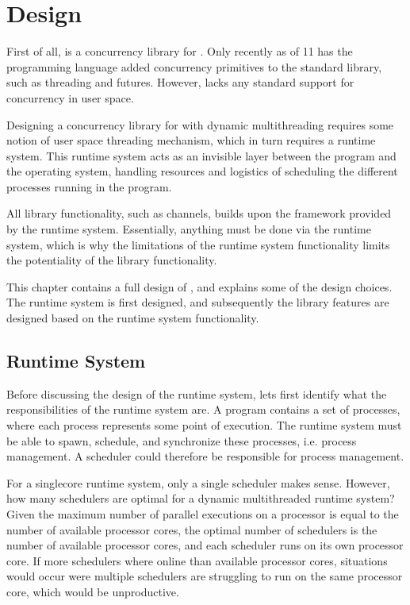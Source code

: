 

\chapter{Design}
\label{ch:design}


First of all, \Proxc{} is a concurrency library for \Cpp{}. Only recently as of \Cpp{}11 has the \Cpp{} programming language added concurrency primitives to the standard library, such as threading and futures. However, \Cpp{} lacks any standard support for concurrency in user space. 

Designing a concurrency library for \Cpp{} with dynamic multithreading requires some notion of user space threading mechanism, which in turn requires a runtime system. This runtime system acts as an invisible layer between the program and the operating system, handling resources and logistics of scheduling the different processes running in the program. 

All library functionality, such as channels, builds upon the framework provided by the runtime system. Essentially, anything must be done via the runtime system, which is why the limitations of the runtime system functionality limits the potentiality of the library functionality.

This chapter contains a full design of \Proxc{}, and explains some of the design choices. The runtime system is first designed, and subsequently the library features are designed based on the runtime system functionality. 


\section{Runtime System}


Before discussing the design of the runtime system, lets first identify what the responsibilities of the runtime system are. A \Proxc{} program contains a set of processes, where each process represents some point of execution. The runtime system must be able to spawn, schedule, and synchronize these processes, i.e. process management. A scheduler could therefore be responsible for process management. 

For a singlecore runtime system, only a single scheduler makes sense. However, how many schedulers are optimal for a dynamic multithreaded runtime system? Given the maximum number of parallel executions on a processor is equal to the number of available processor cores, the optimal number of schedulers is the number of available processor cores, and each scheduler runs on its own processor core. If more schedulers where online than available processor cores, situations would occur were multiple schedulers are struggling to run on the same processor core, which would be unproductive.

